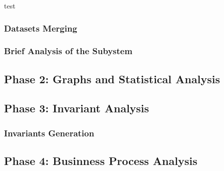 test

\subsubsection{Datasets Merging}
\label{subsubsec:4_dataset_merging}

\subsubsection{Brief Analysis of the Subystem}
\label{subsubsec:4_brief_analysis}

\subsection{Phase 2: Graphs and Statistical Analysis}
\label{subsec:improve_graphs}

\subsection{Phase 3: Invariant Analysis}
\label{subsec:improve_invariants}

\subsubsection{Invariants Generation}

\subsection{Phase 4: Businness Process Analysis}
\label{subsec:improve_bpa}


\vfill
\nolinenumbers